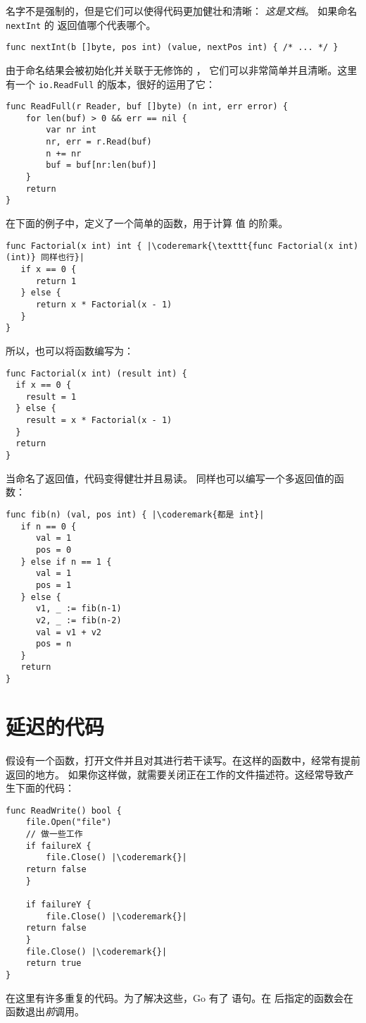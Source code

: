名字不是强制的，但是它们可以使得代码更加健壮和清晰：
\emph{这是文档}。
如果命名 \lstinline{nextInt} 的  返回值哪个代表哪个。

\begin{lstlisting}
func nextInt(b []byte, pos int) (value, nextPos int) { /* ... */ }
\end{lstlisting}
由于命名结果会被初始化并关联于无修饰的 ，
它们可以非常简单并且清晰。这里有一个 \lstinline{io.ReadFull} 的版本，很好的运用了它：

\begin{lstlisting}
func ReadFull(r Reader, buf []byte) (n int, err error) {
    for len(buf) > 0 && err == nil {
        var nr int
        nr, err = r.Read(buf)
        n += nr
        buf = buf[nr:len(buf)]
    }
    return
}
\end{lstlisting}
在下面的例子中，定义了一个简单的函数，用于计算
值  的阶乘。
\begin{lstlisting}
func Factorial(x int) int { |\coderemark{\texttt{func Factorial(x int) (int)} 同样也行}|
   if x == 0 {
      return 1
   } else {
      return x * Factorial(x - 1)
   }
}
\end{lstlisting}
所以，也可以将函数编写为：
\begin{lstlisting}
func Factorial(x int) (result int) {
  if x == 0 {
    result = 1	
  } else {
    result = x * Factorial(x - 1)
  }
  return
}
\end{lstlisting}
当命名了返回值，代码变得健壮并且易读。
同样也可以编写一个多返回值的函数：
\begin{lstlisting}
func fib(n) (val, pos int) { |\coderemark{都是 int}|
   if n == 0 {
      val = 1
      pos = 0
   } else if n == 1 {
      val = 1
      pos = 1
   } else {
      v1, _ := fib(n-1)
      v2, _ := fib(n-2)
      val = v1 + v2
      pos = n
   }
   return
}
\end{lstlisting}

\section{延迟的代码}
\label{sec:deferred code}
假设有一个函数，打开文件并且对其进行若干读写。在这样的函数中，经常有提前返回的地方。
如果你这样做，就需要关闭正在工作的文件描述符。这经常导致产生下面的代码：
\begin{lstlisting}[caption=没有 defer]
func ReadWrite() bool {
    file.Open("file")
    // 做一些工作
    if failureX {
        file.Close() |\coderemark{}|
	return false
    }

    if failureY {
        file.Close() |\coderemark{}|
	return false
    }
    file.Close() |\coderemark{}|
    return true
}
\end{lstlisting}
在这里有许多重复的代码。为了解决这些，Go 有了
 语句。在 
后指定的函数会在函数退出\emph{前}调用。

